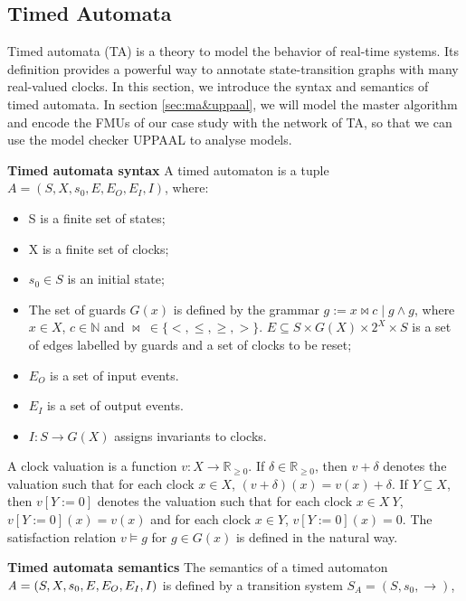 \subsection{Timed Automata}
Timed automata (TA) \cite{BehrmannDLHPYH06} is a theory to model the behavior of real-time systems. Its definition provides a powerful way to annotate state-transition graphs with many real-valued clocks. In this section, we introduce the syntax and semantics of timed automata. In section \ref{sec:ma&uppaal}, we will model the master algorithm and encode the FMUs of our case study with the network of TA, so that we can use the model checker UPPAAL to analyse models.
\begin{definition}
\textbf{Timed automata syntax}
A timed automaton is a tuple $\textit{A}=(S,X,s_{0},E,E_{O},E_{I},I)$, where:
\end{definition}
\begin{itemize}
\item
S is a finite set of states;
\item
X is a finite set of clocks;
\item
$s_{0}\in  S$ is an initial state;
\item
The set of guards $G(x)$ is defined by the grammar $g := x \bowtie c \mid g \land g$, where $x \in X$, $c \in \mathbb{N}$ and $\bowtie~\in \{<,\leqslant,\geqslant,>\}$. $E\subseteq S \times G(X) \times 2^X \times S$ is a set of edges labelled by guards and a set of clocks to be reset;
\item
$E_{O}$ is a set of input events.
\item
$E_{I}$ is a set of output events.
\item
$I : S \rightarrow G(X)$ assigns invariants to clocks.
\end{itemize}
A clock valuation is a function $v : X \rightarrow \mathbb{R}_{\geqslant{0}}$. If $\delta \in \mathbb{R}_{\geqslant{0}}$, then $v + \delta$ denotes the valuation such that for each clock $x \in X$, $(v + \delta)(x) = v(x) + \delta$. If $Y \subseteq X$, then $v[Y := 0]$ denotes the valuation such that for each clock $x \in X~Y$, $v[Y := 0 ](x) = v(x)$ and for each clock $x \in Y$, $v[Y := 0](x) = 0$. The satisfaction relation $v \models g$ for $g \in G(x)$ is defined in the natural way.
\begin{definition}
\textbf{Timed automata semantics} 
The semantics of a timed automaton $\textit{A} = (S,X,s_{0},E, \\E_{O},E_{I},I)$ is defined by a transition system $S_{\textit{A}} = (S,s_{0},\rightarrow)$, \end{definition}
